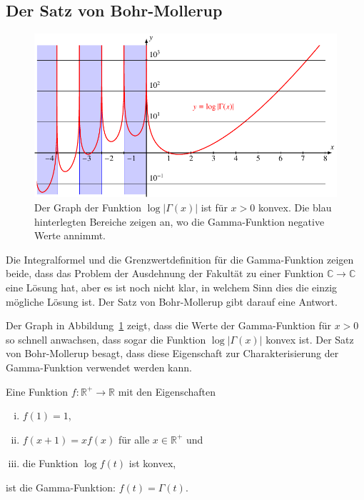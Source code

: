 %
%
%
\subsection{Der Satz von Bohr-Mollerup
\label{buch:rekursion:subsection:bohr-mollerup}}
\begin{figure}
\centering
\includegraphics{chapters/040-rekursion/images/loggammaplot.pdf}
\caption{Der Graph der Funktion $\log|\Gamma(x)|$ ist für $x>0$ konvex. 
Die blau hinterlegten Bereiche zeigen an, wo die Gamma-Funktion
negative Werte annimmt.
\label{buch:rekursion:gamma:loggammaplot}}
\end{figure}
Die Integralformel und die Grenzwertdefinition für die Gamma-Funktion
zeigen beide, dass das Problem der Ausdehnung der Fakultät zu einer
Funktion $\mathbb{C}\to\mathbb{C}$ eine Lösung hat, aber es ist noch
nicht klar, in welchem Sinn dies die einzig mögliche Lösung ist.
Der Satz von Bohr-Mollerup gibt darauf eine Antwort.

Der Graph in Abbildung~\ref{buch:rekursion:gamma:loggammaplot}
zeigt, dass die Werte der Gamma-Funktion für $x>0$ so schnell
anwachsen, dass sogar die Funktion $\log|\Gamma(x)|$ konvex ist.
Der Satz von Bohr-Mollerup besagt, dass diese Eigenschaft zur
Charakterisierung der Gamma-Funktion verwendet werden kann.

\begin{satz}
\label{buch:satz:bohr-mollerup}
Eine Funktion $f\colon \mathbb{R}^+\to\mathbb{R}$ mit den Eigenschaften
\begin{enumerate}[i)]
\item $f(1)=1$,
\item $f(x+1)=xf(x)$ für alle $x\in\mathbb{R}^+$ und
\item die Funktion $\log f(t)$ ist konvex,
\end{enumerate}
ist die Gamma-Funktion: $f(t)=\Gamma(t)$.
%
%
\end{satz}

